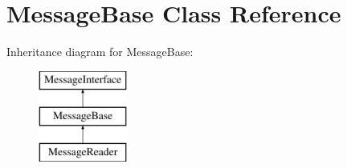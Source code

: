 \hypertarget{class_message_base}{}\section{Message\+Base Class Reference}
\label{class_message_base}
Inheritance diagram for Message\+Base\+:\begin{figure}[H]
\begin{center}
\leavevmode
\includegraphics[height=3.000000cm]{class_message_base}
\end{center}
\end{figure}
